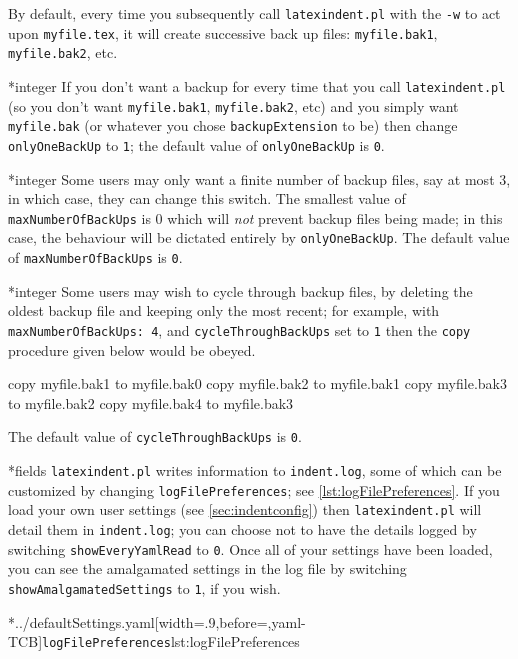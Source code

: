 	By default, every time you subsequently call \texttt{latexindent.pl} with the
	\texttt{-w} to act upon \texttt{myfile.tex}, it will create successive
	back up files: \texttt{myfile.bak1}, \texttt{myfile.bak2}, etc.

*{integer}
	\label{page:onlyonebackup}
	If you don't want a backup for every time that you call \texttt{latexindent.pl} (so
	you don't want \texttt{myfile.bak1}, \texttt{myfile.bak2}, etc) and you
	simply want \texttt{myfile.bak} (or whatever you chose \texttt{backupExtension} to be) then change \texttt{onlyOneBackUp} to
	\texttt{1}; the default value of \texttt{onlyOneBackUp} is
	\texttt{0}.

*{integer}
	Some users may only want a finite number of backup files, say at most
	$3$, in which case, they can change this switch. The smallest value of
	\texttt{maxNumberOfBackUps} is $0$ which will \emph{not}
	prevent backup files being made; in this case, the behaviour will be dictated entirely by
	\texttt{onlyOneBackUp}. The default value of \texttt{maxNumberOfBackUps} is
	\texttt{0}.

*{integer}
	Some users may wish to cycle through backup files, by deleting the oldest backup file and
	keeping only the most recent; for example, with \texttt{maxNumberOfBackUps: 4}, and
	\texttt{cycleThroughBackUps} set to \texttt{1} then the \texttt{copy}
	procedure given below would be obeyed.

	\begin{commandshell}
copy myfile.bak1 to myfile.bak0
copy myfile.bak2 to myfile.bak1
copy myfile.bak3 to myfile.bak2
copy myfile.bak4 to myfile.bak3
\end{commandshell}
	The default value of \texttt{cycleThroughBackUps} is \texttt{0}.

*{fields}
	\texttt{latexindent.pl} writes information to \texttt{indent.log}, some
	of which can be customized by changing \texttt{logFilePreferences}; see
	\cref{lst:logFilePreferences}. If you load your own user settings (see \vref{sec:indentconfig})
	then \texttt{latexindent.pl} will detail them in \texttt{indent.log}; you can choose
	not to have the details logged by switching \texttt{showEveryYamlRead} to
	\texttt{0}. Once all of your settings have been loaded, you can see the
	amalgamated settings in the log file by switching \texttt{showAmalgamatedSettings} to
	\texttt{1}, if you wish.

	\cmhlistingsfromfile[style=logFilePreferences,]*{../defaultSettings.yaml}[width=.9\linewidth,before=\centering,yaml-TCB]{\texttt{logFilePreferences}}{lst:logFilePreferences}

